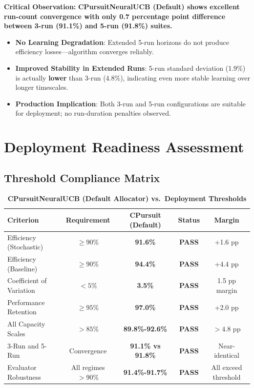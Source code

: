 \documentclass[12pt,a4paper]{article}
\newcommand{\success}[1]{\textcolor{successcolor}{\textbf{#1}}}
\begin{document}
\textbf{Critical Observation:} \success{CPursuitNeuralUCB (Default) shows \textbf{excellent run-count convergence} with only 0.7 percentage point difference between 3-run (91.1\%) and 5-run (91.8\%) suites.}

\begin{itemize}
\item \success{No Learning Degradation}: Extended 5-run horizons do not produce efficiency losses—algorithm converges reliably.

\item \success{Improved Stability in Extended Runs}: 5-run standard deviation (1.9\%) is actually \textbf{lower} than 3-run (4.8\%), indicating even more stable learning over longer timescales.

\item \success{Production Implication}: Both 3-run and 5-run configurations are suitable for deployment; no run-duration penalties observed.
\end{itemize}

\section{Deployment Readiness Assessment}

\subsection{Threshold Compliance Matrix}

\begin{table}[H]
\centering
\caption{\success{CPursuitNeuralUCB (Default Allocator) vs.\ Deployment Thresholds}}
\begin{tabular}{|l|c|c|c|c|}
\hline
\textbf{Criterion} & \textbf{Requirement} & \textbf{CPursuit (Default)} & \textbf{Status} & \textbf{Margin} \\
\hline
Efficiency (Stochastic) & $\geq 90\%$ & \success{91.6\%} & \success{\checkmark PASS} & +1.6 pp \\
Efficiency (Baseline) & $\geq 90\%$ & \success{94.4\%} & \success{\checkmark PASS} & +4.4 pp \\
Coefficient of Variation & $< 5\%$ & \success{3.5\%} & \success{\checkmark PASS} & 1.5 pp margin \\
Performance Retention & $\geq 95\%$ & \success{97.0\%} & \success{\checkmark PASS} & +2.0 pp \\
All Capacity Scales & $> 85\%$ & \success{89.8\%-92.6\%} & \success{\checkmark PASS} & $>4.8$ pp \\
3-Run and 5-Run & Convergence & \success{91.1\% vs 91.8\%} & \success{\checkmark PASS} & Near-identical \\
Evaluator Robustness & All regimes $>90\%$ & \success{91.4\%-91.7\%} & \success{\checkmark PASS} & All exceed threshold \\
\hline
\end{tabular}
\end{table}
\end{document}
